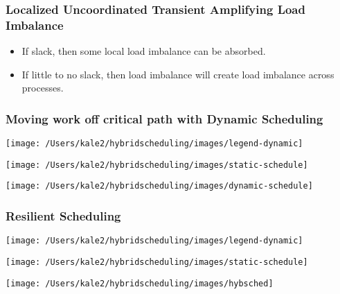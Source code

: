 \begin{frame}
\frametitle{Localized Uncoordinated Transient Amplifying Load Imbalance}
\begin{itemize}
\item \small If slack, then some local load imbalance can be absorbed.
\item \small If little to no slack, then load imbalance will create load imbalance across processes.
\end{itemize}
\end{frame}

\begin{frame}
\frametitle{Moving work off critical path with Dynamic Scheduling}
\texttt{[image: /Users/kale2/hybridscheduling/images/legend-dynamic]}
\begin{center}
\texttt{[image: /Users/kale2/hybridscheduling/images/static-schedule]}
\end{center}
\begin{center}
\texttt{[image: /Users/kale2/hybridscheduling/images/dynamic-schedule]}
\end{center}
\end{frame}

\begin{frame}
\frametitle{Resilient Scheduling}
\texttt{[image: /Users/kale2/hybridscheduling/images/legend-dynamic]}
\begin{center}
\texttt{[image: /Users/kale2/hybridscheduling/images/static-schedule]}
\end{center}
\begin{center}
\texttt{[image: /Users/kale2/hybridscheduling/images/hybsched]}
\end{center}
\end{frame}


